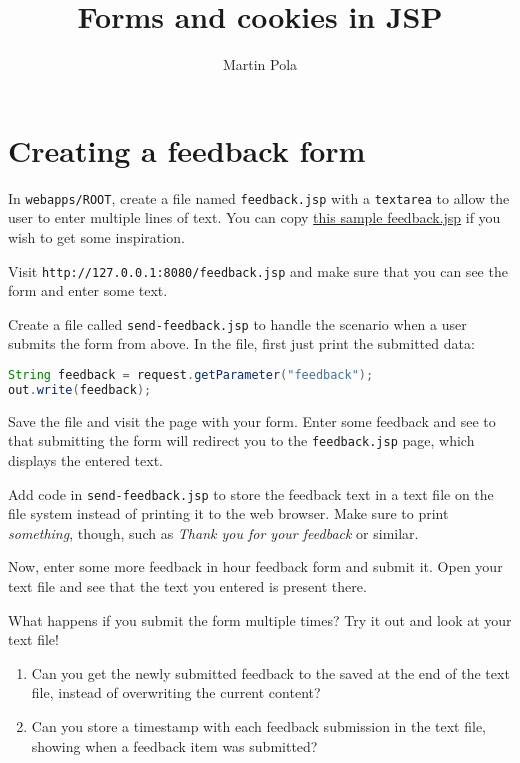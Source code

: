 \documentclass[a4paper, english]{article}
\title{Forms and cookies in JSP}
\author{Martin Pola}
\date{}
\begin{document}
    \maketitle

    \section{Creating a feedback form}
        In \texttt{webapps/ROOT}, create a file named \texttt{feedback.jsp} with a \texttt{textarea} to allow the user to enter multiple lines of text. You can copy \href{https://klistra.in/gGlqrs8v}{this sample feedback.jsp} if you wish to get some inspiration.

        Visit \texttt{http://127.0.0.1:8080/feedback.jsp} and make sure that you can see the form and enter some text.

        Create a file called \texttt{send-feedback.jsp} to handle the scenario when a user submits the form from above. In the file, first just print the submitted data:
\begin{lstlisting}[style=customjsp,language=java]
String feedback = request.getParameter("feedback");
out.write(feedback);\end{lstlisting}

        Save the file and visit the page with your form. Enter some feedback and see to that submitting the form will redirect you to the \texttt{feedback.jsp} page, which displays the entered text.

        Add code in \texttt{send-feedback.jsp} to store the feedback text in a text file on the file system instead of printing it to the web browser. Make sure to print \emph{something}, though, such as \emph{Thank you for your feedback} or similar.

        Now, enter some more feedback in hour feedback form and submit it. Open your text file and see that the text you entered is present there.

        What happens if you submit the form multiple times? Try it out and look at your text file!

        \begin{enumerate}
            \item Can you get the newly submitted feedback to the saved at the end of the text file, instead of overwriting the current content?
            \item Can you store a timestamp with each feedback submission in the text file, showing when a feedback item was submitted?
        \end{enumerate}
\end{document}
